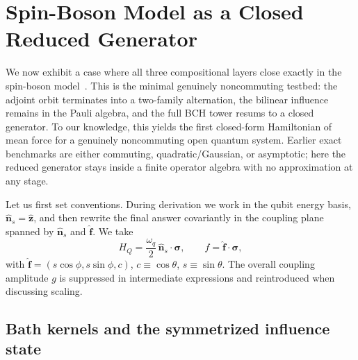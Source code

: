 \section{Spin-Boson Model as a Closed Reduced Generator}
\label{sec:qubit_closed_generator}\label{subsec:qubit_exact_geometry}

We now exhibit a case where all three compositional layers close exactly in the
spin-boson model~\cite{leggettDynamicsDissipativeTwostate1987,weissQuantumDissipativeSystems2012}.
This is the minimal genuinely noncommuting testbed: the adjoint orbit
terminates into a two-family alternation, the bilinear influence remains in the
Pauli algebra, and the full BCH tower resums to a closed generator. To our
knowledge, this yields the first closed-form Hamiltonian of mean force for a
genuinely noncommuting open quantum system. Earlier exact benchmarks are either
commuting, quadratic/Gaussian, or asymptotic; here the reduced generator stays
inside a finite operator algebra with no approximation at any stage.

Let us first set conventions. During derivation we work in the qubit energy
basis, $\hat{\mathbf n}_s=\hat{\mathbf z}$, and then rewrite the final answer
covariantly in the coupling plane spanned by $\hat{\mathbf n}_s$ and
$\hat{\mathbf f}$. We take
\begin{equation}
    H_Q = \frac{\omega_q}{2}\,\hat{\mathbf n}_s\!\cdot\!\boldsymbol{\sigma},
    \qquad
    f = \hat{\mathbf f}\!\cdot\!\boldsymbol{\sigma},
\end{equation}
with $\hat{\mathbf f}=(s\cos\phi,s\sin\phi,c)$, $c\equiv\cos\theta$,
$s\equiv\sin\theta$. The overall coupling amplitude $g$ is suppressed in
intermediate expressions and reintroduced when discussing scaling.

\subsection{Bath kernels and the symmetrized influence state}
\label{subsec:qubit_influence_state}

